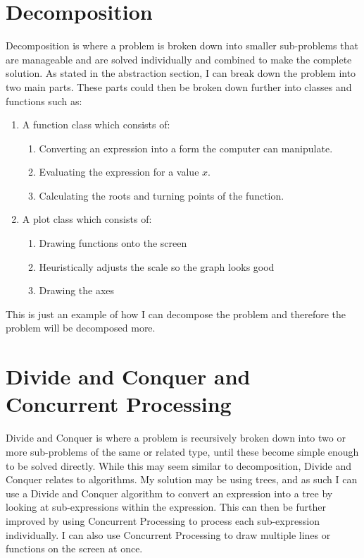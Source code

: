 \documentclass[../../../main.tex]{subfiles}
\begin{document}
\section{Decomposition}
Decomposition is where a problem is broken down into smaller sub-problems that are manageable and are solved individually and combined to make the complete solution. As stated in the abstraction section, I can break down the problem into two main parts. These parts could then be broken down further into classes and functions such as:
\begin{enumerate}
	\item A function class which consists of:
		\begin{enumerate}
			\item Converting an expression into a form the computer can manipulate.
			\item Evaluating the expression for a value $x$.
			\item Calculating the roots and turning points of the function.
		\end{enumerate}
	\item A plot class which consists of:
		\begin{enumerate}
			\item Drawing functions onto the screen
			\item Heuristically adjusts the scale so the graph looks good
			\item Drawing the axes
		\end{enumerate}
\end{enumerate}
This is just an example of how I can decompose the problem and therefore the problem will be decomposed more.
\section{Divide and Conquer and Concurrent Processing}
Divide and Conquer is where a problem is recursively broken down into two or more sub-problems of the same or related type, until these become simple enough to be solved directly. While this may seem similar to decomposition, Divide and Conquer relates to algorithms. My solution may be using trees, and as such I can use a Divide and Conquer algorithm to convert an expression into a tree by looking at sub-expressions within the expression. This can then be further improved by using Concurrent Processing to process each sub-expression individually. I can also use Concurrent Processing to draw multiple lines or functions on the screen at once.
\end{document}

